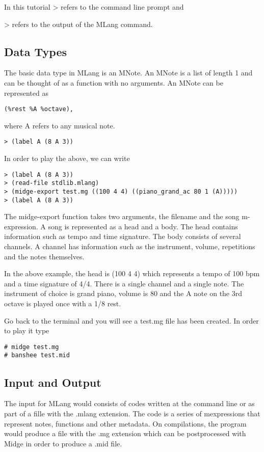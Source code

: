 \documentclass[letterpaper,11pt]{article}
\begin{document}
In this tutorial > refers to the command line prompt and {> refers to the
output of the MLang command.

\subsection{Data Types}
The basic data type in MLang is an MNote. An MNote is a list of length 1
and can be thought of as a function with no arguments.
An MNote can be represented as 

\lstset{breaklines=true,language=Lisp}
\begin{lstlisting}
(%rest %A %octave), 
\end{lstlisting}

where A refers to any musical note.
\lstset{breaklines=true,language=Lisp}
\begin{lstlisting}
> (label A (8 A 3))
\end{lstlisting}

In order to play the above, we can write

\lstset{breaklines=true,language=Lisp}
\begin{lstlisting}
> (label A (8 A 3))
> (read-file stdlib.mlang)
> (midge-export test.mg ((100 4 4) ((piano_grand_ac 80 1 (A)))))
> (label A (8 A 3))
\end{lstlisting}
The midge-export function takes two arguments, the filename and the song m-expression. A song is represented as a head and a body. The head contains
information such as tempo and time signature. The body consists of several channels. A channel has information such as the instrument, volume, repetitions and the notes themselves.

In the above example, the head is (100 4 4) which represents a tempo of 100 bpm and a time signature of 4/4.
There is a single channel and a single note. The instrument of choice is grand piano, volume is 80 and the A note on the 3rd octave is played once
with a 1/8 rest.

Go back to the terminal and you will see a test.mg file has been created. In order to play it type

\lstset{breaklines=true,language=bash}
\begin{lstlisting}
# midge test.mg
# banshee test.mid

\end{lstlisting}

\subsection{Input and Output}
The input for MLang would consists of codes written at the command line or as part of a fille with the .mlang extension.
The code is a series of mexpressions that represent notes, functions and other metadata.
On compilations, the program would produce a file with the .mg extension which can be postprocessed with Midge in order to produce a .mid file.

}
\end{document}
